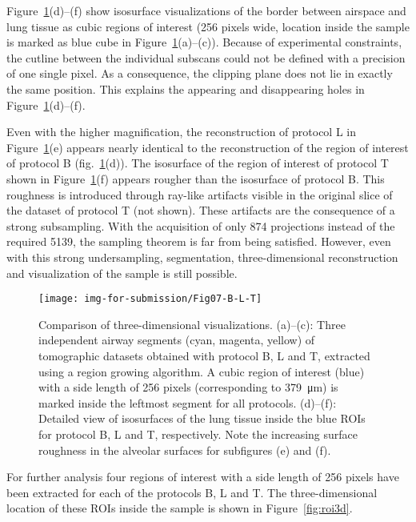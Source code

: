 Figure~\ref{fig:BvsT}(d)--(f) show isosurface visualizations of the border between airspace and lung tissue as cubic regions of interest (256 pixels wide, location inside the sample is marked as blue cube in Figure~\ref{fig:BvsT}(a)--(c)). Because of experimental constraints, the cutline between the individual subscans could not be defined with a precision of one single pixel. As a consequence, the clipping plane does not lie in exactly the same position. This explains the appearing and disappearing holes in Figure~\ref{fig:BvsT}(d)--(f).

Even with the higher magnification, the reconstruction of protocol L in Figure~\ref{fig:BvsT}(e) appears nearly identical to the reconstruction of the region of interest of protocol B (fig.~\ref{fig:BvsT}(d)). The isosurface of the region of interest of protocol T shown in Figure~\ref{fig:BvsT}(f) appears rougher than the isosurface of protocol B. This roughness is introduced through ray-like artifacts visible in the original slice of the dataset of protocol T (not shown). These artifacts are the consequence of a strong subsampling. With the acquisition of only 874 projections instead of the required 5139, the sampling theorem is far from being satisfied. However, even with this strong undersampling, segmentation, three-dimensional reconstruction and visualization of the sample is still possible.

\begin{figure}
	\centering
	\caption{Comparison of three-dimensional visualizations. %
			(a)--(c): Three independent airway segments (cyan, magenta, yellow) of tomographic datasets obtained with protocol B, L and T, extracted using a region growing algorithm. A cubic region of interest (blue) with a side length of 256 pixels (corresponding to \SI{379}{\micro\meter}) is marked inside the leftmost segment for all protocols. %
			(d)--(f): Detailed view of isosurfaces of the lung tissue inside the blue ROIs for protocol B, L and T, respectively. Note the increasing surface roughness in the alveolar surfaces for subfigures (e) and (f).}%
	\texttt{[image: img-for-submission/Fig07-B-L-T]}
	\label{fig:BvsT}
\end{figure}%

For further analysis four regions of interest with a side length of 256 pixels have been extracted for each of the protocols B, L and T. The three-dimensional location of these ROIs inside the sample is shown in Figure~\ref{fig:roi3d}.

